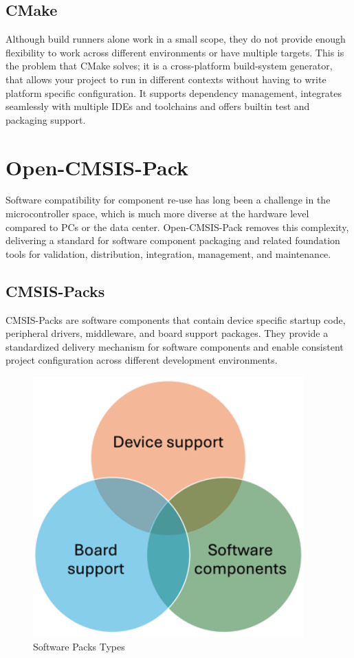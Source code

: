 \subsection{CMake}
Although build runners alone work in a small scope, they do not provide enough flexibility to work across different environments or have multiple targets. This is the problem that CMake solves; it is a cross-platform build-system generator, that allows your project to run in different contexts without having to write platform specific configuration. It supports dependency management, integrates seamlessly with multiple IDEs and toolchains and offers builtin test and packaging support.
\section{Open-CMSIS-Pack}
Software compatibility for component re-use has long been a challenge in the microcontroller space, which is much more diverse at the hardware level compared to PCs or the data center. Open-CMSIS-Pack removes this complexity, delivering a standard for software component packaging and related foundation tools for validation, distribution, integration, management, and maintenance.
\subsection{CMSIS-Packs} CMSIS-Packs are software components that contain device specific startup code, peripheral drivers, middleware, and board support packages. They provide a standardized delivery mechanism for software components and enable consistent project configuration across different development environments.
\begin{figure}[H]
  \centering
  \includegraphics[height=10cm]{img/ST_Summer_Internship/pack_trinity.png}
  \caption{Software Packs Types}
  \label{fig:sw_trinity}
\end{figure}
